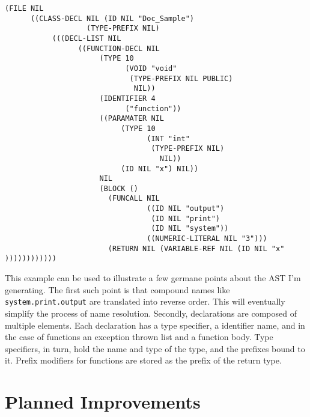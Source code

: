 \documentclass{article}[1994/05/24]
\begin{document}
\begin{verbatim}
(FILE NIL
      ((CLASS-DECL NIL (ID NIL "Doc_Sample") 
                   (TYPE-PREFIX NIL)
           (((DECL-LIST NIL
                 ((FUNCTION-DECL NIL
                      (TYPE 10
                            (VOID "void" 
                             (TYPE-PREFIX NIL PUBLIC)
                              NIL))
                      (IDENTIFIER 4 
                            ("function"))
                      ((PARAMATER NIL
                           (TYPE 10 
                                 (INT "int" 
                                  (TYPE-PREFIX NIL)
                                    NIL))
                           (ID NIL "x") NIL))
                      NIL
                      (BLOCK ()
                        (FUNCALL NIL
                                 ((ID NIL "output")
                                  (ID NIL "print")
                                  (ID NIL "system"))
                                 ((NUMERIC-LITERAL NIL "3")))
                        (RETURN NIL (VARIABLE-REF NIL (ID NIL "x"
))))))))))))
\end{verbatim}

This example can be used to illustrate a few germane points 
about the AST I'm generating.  The first such point is that 
compound names like \verb|system.print.output| are translated
into reverse order.  This will eventually simplify the process
of name resolution.  Secondly, declarations are composed of multiple
elements.  Each declaration has a type specifier, a identifier name,
and in the case of functions an exception thrown list and a function
body.  Type specifiers, in turn, hold the name and type of the type,
and the prefixes bound to it.  Prefix modifiers for functions are
stored as the prefix of the return type.

\section{Planned Improvements}
\end{document}
